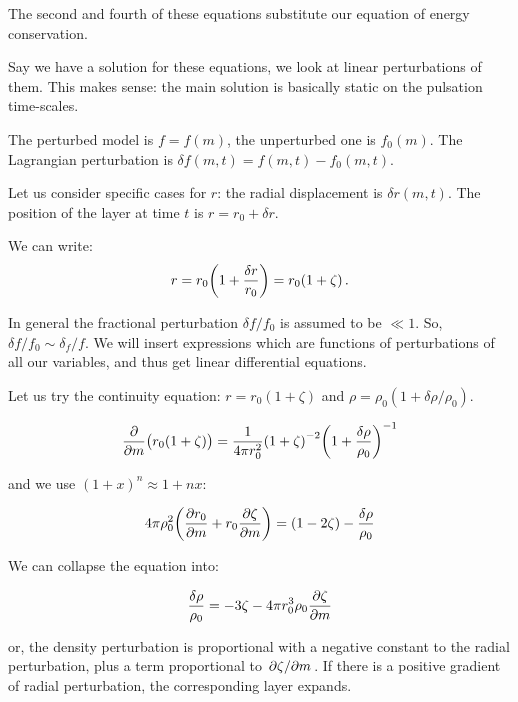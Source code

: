 \documentclass[main.tex]{subfiles}
\begin{document}
The second and fourth of these equations substitute our equation of energy conservation.

Say we have a solution for these equations, we look at linear perturbations of them.
This makes sense: the main solution is basically static on the pulsation time-scales.

The perturbed model is \(f = f(m)\),  the unperturbed one is \(f_0(m)\).
The Lagrangian perturbation is \(\delta f (m, t) = f(m, t) - f_0(m, t)\).

Let us consider specific cases for \(r\): the radial displacement is \(\delta r (m, t)\). The position of the layer at time \(t\) is \(r = r_0 + \delta r\).

We can write:
%
\begin{equation}
  r = r_0 \qty(1 + \frac{\delta r}{r_0} ) = r_0 (1+ \zeta)\,.
\end{equation}

In general the fractional perturbation \(\delta f / f_0\) is assumed to be \(\ll 1 \). So, \(\delta f / f_0 \sim \delta_f / f\).
We will insert expressions which are functions of perturbations of all our variables, and thus get linear differential equations.

Let us try the continuity equation: \(r = r_0 (1+\zeta)\) and \(\rho = \rho_0 (1 + \delta \rho / \rho_0)\).

\begin{equation}
  \pdv{}{m} \qty(r_0 (1+\zeta)) =
  \frac{1}{4 \pi r_0^2} \qty(1+\zeta)^{-2} \qty(1 + \frac{\delta \rho}{\rho_0})^{-1}
\end{equation}

and we use \((1+x)^n \approx 1 + nx\):

\begin{equation}
  4 \pi \rho_0^2 \qty(\pdv{r_0}{m} (1+\zeta) + r_0 \pdv{\zeta}{m})
  = (1-2 \zeta) -\frac{\delta \rho}{\rho_0}
\end{equation}

We can collapse the equation into:

\begin{equation}
  \frac{\delta \rho}{\rho_0} =
  - 3 \zeta - 4 \pi r_0^3 \rho_0 \pdv{\zeta}{m}
\end{equation}

or, the density perturbation is proportional with a negative constant to the radial perturbation, plus a term proportional to \(\pdv*{\zeta}{m}\).
If there is a positive gradient of radial perturbation, the corresponding layer expands.
\end{document}
